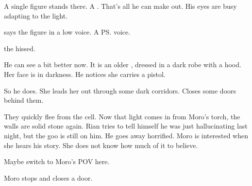 
A single figure stands there. 
A \scatha. 
That's all he can make out. 
His eyes are busy adapting to the light. 

 says the figure in a low voice. 
A \ps{\sphyle} voice.





the \scatha hissed.



He can see a bit better now. 
It is an older \sphyle, dressed in a dark robe with a hood. 
Her face is in darkness. 
He notices she carries a pistol. 


So he does. 
She leads her out through some dark corridors. 
Closes some doors behind them. 

They quickly flee from the cell. 
Now that light comes in from Moro's torch, the walls are solid stone again.
Rian tries to tell himself he was just hallucinating last night, but the goo is still on him. 
He goes away horrified. 
Moro is interested when she hears his story.
She does not know how much of it to believe. 





\begin{comment}
  \section{Moro and Rian talk}
\end{comment}
\new
Maybe switch to Moro's POV here.

Moro stops and closes a door. 


